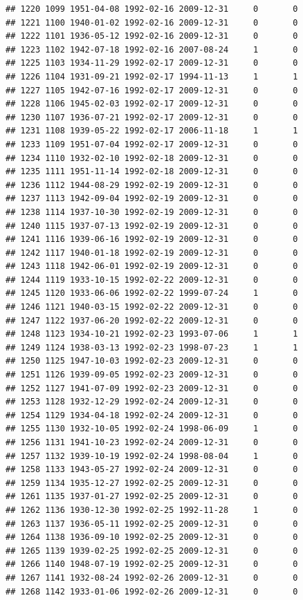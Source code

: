 \documentclass[
]{book}
\theoremstyle{definition}
\theoremstyle{definition}
\theoremstyle{definition}
\theoremstyle{definition}
\theoremstyle{remark}
\begin{document}
\begin{verbatim}
## 1220 1099 1951-04-08 1992-02-16 2009-12-31     0       0
## 1221 1100 1940-01-02 1992-02-16 2009-12-31     0       0
## 1222 1101 1936-05-12 1992-02-16 2009-12-31     0       0
## 1223 1102 1942-07-18 1992-02-16 2007-08-24     1       0
## 1225 1103 1934-11-29 1992-02-17 2009-12-31     0       0
## 1226 1104 1931-09-21 1992-02-17 1994-11-13     1       1
## 1227 1105 1942-07-16 1992-02-17 2009-12-31     0       0
## 1228 1106 1945-02-03 1992-02-17 2009-12-31     0       0
## 1230 1107 1936-07-21 1992-02-17 2009-12-31     0       0
## 1231 1108 1939-05-22 1992-02-17 2006-11-18     1       1
## 1233 1109 1951-07-04 1992-02-17 2009-12-31     0       0
## 1234 1110 1932-02-10 1992-02-18 2009-12-31     0       0
## 1235 1111 1951-11-14 1992-02-18 2009-12-31     0       0
## 1236 1112 1944-08-29 1992-02-19 2009-12-31     0       0
## 1237 1113 1942-09-04 1992-02-19 2009-12-31     0       0
## 1238 1114 1937-10-30 1992-02-19 2009-12-31     0       0
## 1240 1115 1937-07-13 1992-02-19 2009-12-31     0       0
## 1241 1116 1939-06-16 1992-02-19 2009-12-31     0       0
## 1242 1117 1940-01-18 1992-02-19 2009-12-31     0       0
## 1243 1118 1942-06-01 1992-02-19 2009-12-31     0       0
## 1244 1119 1933-10-15 1992-02-22 2009-12-31     0       0
## 1245 1120 1933-06-06 1992-02-22 1999-07-24     1       0
## 1246 1121 1940-03-15 1992-02-22 2009-12-31     0       0
## 1247 1122 1937-06-20 1992-02-22 2009-12-31     0       0
## 1248 1123 1934-10-21 1992-02-23 1993-07-06     1       1
## 1249 1124 1938-03-13 1992-02-23 1998-07-23     1       1
## 1250 1125 1947-10-03 1992-02-23 2009-12-31     0       0
## 1251 1126 1939-09-05 1992-02-23 2009-12-31     0       0
## 1252 1127 1941-07-09 1992-02-23 2009-12-31     0       0
## 1253 1128 1932-12-29 1992-02-24 2009-12-31     0       0
## 1254 1129 1934-04-18 1992-02-24 2009-12-31     0       0
## 1255 1130 1932-10-05 1992-02-24 1998-06-09     1       0
## 1256 1131 1941-10-23 1992-02-24 2009-12-31     0       0
## 1257 1132 1939-10-19 1992-02-24 1998-08-04     1       0
## 1258 1133 1943-05-27 1992-02-24 2009-12-31     0       0
## 1259 1134 1935-12-27 1992-02-25 2009-12-31     0       0
## 1261 1135 1937-01-27 1992-02-25 2009-12-31     0       0
## 1262 1136 1930-12-30 1992-02-25 1992-11-28     1       0
## 1263 1137 1936-05-11 1992-02-25 2009-12-31     0       0
## 1264 1138 1936-09-10 1992-02-25 2009-12-31     0       0
## 1265 1139 1939-02-25 1992-02-25 2009-12-31     0       0
## 1266 1140 1948-07-19 1992-02-25 2009-12-31     0       0
## 1267 1141 1932-08-24 1992-02-26 2009-12-31     0       0
## 1268 1142 1933-01-06 1992-02-26 2009-12-31     0       0

\end{verbatim}
\end{document}
